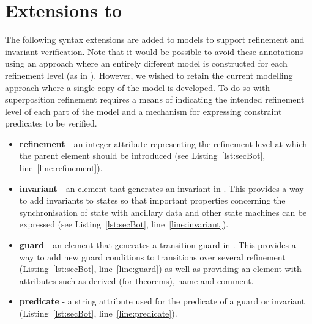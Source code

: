 
\section{Extensions to \SCXML}
\label{sec:extensions}
 
The following syntax extensions are added to \SCXML models to support refinement and invariant verification. 
Note that it would be possible to avoid these annotations using an approach where an entirely different model is constructed for each refinement level (as in \EventB).
However, we wished to retain the current \SCXML modelling approach where a single copy of the model is developed. To do so with superposition refinement requires a means of indicating the intended refinement level of each part of the model and a mechanism for expressing constraint predicates to be verified.
\begin{itemize}
	\item \textbf{refinement} - an integer attribute representing the refinement level at which the parent element should be introduced (see Listing~\ref{lst:secBot}, line~\ref{line:refinement}).
	\item \textbf{invariant} - an element that generates an invariant in \iUMLB. This provides a way to add invariants to states so that important properties concerning the synchronisation of state with ancillary data and other state machines can be expressed (see Listing~\ref{lst:secBot}, line~\ref{line:invariant}).
	\item \textbf{guard} - an element that generates a transition guard in \iUMLB. 
	This provides a way to add new guard conditions to transitions over several refinement (Listing~\ref{lst:secBot}, line~\ref{line:guard}) as well as providing an element with attributes such as derived (for \EventB theorems), name and comment.
	\item \textbf{predicate} - a string attribute used for the predicate of a guard or invariant (Listing~\ref{lst:secBot}, line~\ref{line:predicate}).
\end{itemize}

